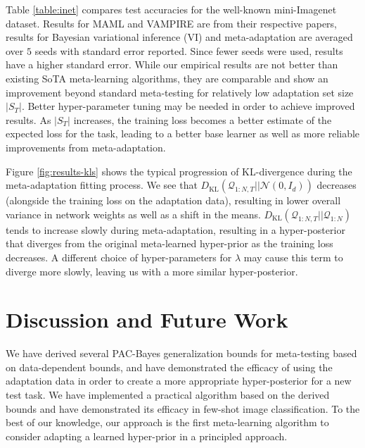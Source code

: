 \documentclass{article} %
\theoremstyle{definition}
\begin{document}
Table \ref{table:inet} compares test accuracies for the well-known mini-Imagenet \citep{Vinyals2016} dataset. Results for MAML \citep{Finn2017} and VAMPIRE \citep{nguyen2020} are from their respective papers, results for Bayesian variational inference (VI) and meta-adaptation are averaged over $5$ seeds with standard error reported. Since fewer seeds were used, results have a higher standard error. While our empirical results are not better than existing SoTA meta-learning algorithms, they are comparable and show an improvement beyond standard meta-testing for relatively low adaptation set size $|S_T|$. Better hyper-parameter tuning may be needed in order to achieve improved results. As $|S_T|$ increases, the training loss becomes a better estimate of the expected loss for the task, leading to a better base learner as well as more reliable improvements from meta-adaptation. 

Figure \ref{fig:results-kls} shows the typical progression of KL-divergence during the meta-adaptation fitting process. We see that $D_{\mathrm{KL}}(\mathcal{Q}_{1:N,T}||\mathcal{N}(0,I_d))$ decreases (alongside the training loss on the adaptation data), resulting in lower overall variance in network weights as well as a shift in the means. $D_{\mathrm{KL}}(\mathcal{Q}_{1:N,T}||\mathcal{Q}_{1:N})$ tends to increase slowly during meta-adaptation, resulting in a hyper-posterior that diverges from the original meta-learned hyper-prior as the training loss decreases. A different choice of hyper-parameters for $\lambda$ may cause this term to diverge more slowly, leaving us with a more similar hyper-posterior.

 \citep{Vinyals2016}  

\section{Discussion and Future Work}

We have derived several PAC-Bayes generalization bounds for meta-testing based on data-dependent bounds, and have demonstrated the efficacy of using the adaptation data in order to create a more appropriate hyper-posterior for a new test task.
We have implemented a practical algorithm based on the derived bounds and have demonstrated its efficacy in few-shot image classification. To the best of our knowledge, our approach is the first meta-learning algorithm to consider adapting a learned hyper-prior in a principled approach.
\end{document}

